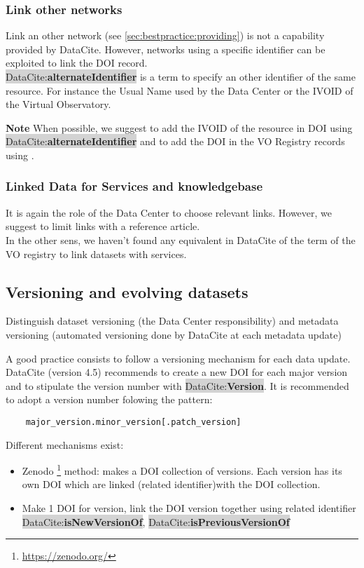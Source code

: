 \documentclass[11pt,a4paper]{ivoa}
\newcommand{\dataciteterm}[1]{\colorbox{lightgray}{DataCite:\textbf{#1}}}
\newcommand{\important}[1]{
	\begin{bigdescription}
		\item \color{ivoacolor}\textbf{Note} #1
	\end{bigdescription}
}
\begin{document}
\subsubsection{Link other networks}
\label{sec:altidentifier}
Link an other network (see \ref{sec:bestpractice:providing}) is not a capability provided by DataCite.
However, networks using a specific identifier can be exploited to link the DOI record.\\
\dataciteterm{alternateIdentifier} is a term to specify an other identifier of the same resource. For instance the Usual Name used by the Data Center or the IVOID of the Virtual Observatory.

\important{When possible, we suggest to add the IVOID of the resource in DOI using \dataciteterm{alternateIdentifier} and to add the DOI in the VO Registry records using \vorent{altIdentifier}.}

\subsubsection{Linked Data for Services and knowledgebase}
It is again the role of the Data Center to choose relevant links. However, we suggest to limit links with a reference article.\\

In the other sens, we haven't found any equivalent in DataCite of the  term of the VO registry to link datasets with services. 


\subsection{Versioning and evolving datasets}
\label{sec:version}
Distinguish dataset versioning (the Data Center responsibility) and metadata versioning (automated versioning done by DataCite at each metadata update)

A good practice consists to follow a versioning mechanism for each data update. DataCite (version 4.5) recommends to create a new DOI for each major version and to stipulate the version number with \dataciteterm{Version}. 
It is recommended to adopt a version number folowing the pattern:
\begin{verbatim}
	major_version.minor_version[.patch_version]
\end{verbatim}


Different mechanisms exist:
\begin{itemize}
\item Zenodo \footnote{\url{https://zenodo.org/}} method: makes a DOI collection of versions. Each version has its own DOI which are linked (related identifier)with the DOI collection.
\item Make 1 DOI for version, link the DOI version together using related identifier \dataciteterm{isNewVersionOf}, \dataciteterm{isPreviousVersionOf}
\end{itemize}
\end{document}
